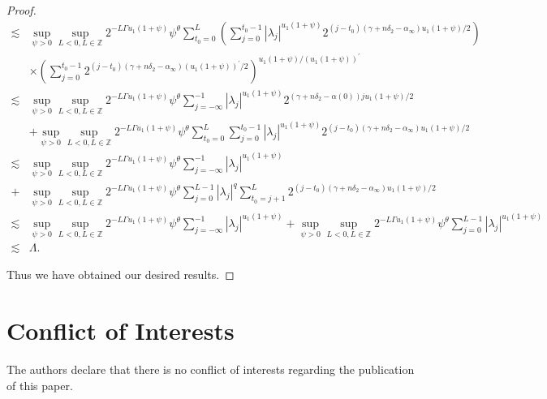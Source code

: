 \documentclass[oneside,reqno]{amsart}
\numberwithin{equation}{section}
\theoremstyle{definition}
\begin{document}
\begin{proof}
\begin{align*}
\lesssim & \sup_{\psi>0}\sup _{L <  0, L \in \mathbb{Z}} 2^{-L \Gamma u_1(1+\psi)} \psi^\theta \sum_{t_0=0}^{L}\left(\sum_{j=0}^{t_0-1}\left|\lambda_{j}\right|^{u_1(1+\psi)} 2^{(j-t_0)\left(\gamma+n\delta_2-\alpha_{\infty}\right) u_1(1+\psi) / 2}\right) \\
& \times\left(\sum_{j=0}^{t_0-1} 2^{(j-t_0)\left(\gamma+n\delta_2-\alpha_{\infty}\right) (u_1(1+\psi))^{\prime} / 2}\right)^{u_1(1+\psi) / (u_1(1+\psi))^{\prime}}\\
\lesssim & \sup_{\psi>0}\sup _{L <  0, L \in \mathbb{Z}} 2^{-L \Gamma u_1(1+\psi)} \psi^\theta \sum_{j=-\infty}^{-1}\left|\lambda_{j}\right|^{u_1(1+\psi)} 2^{\left(\gamma+n\delta_2-\alpha(0)\right) j u_1(1+\psi) / 2} \\
& +\sup_{\psi>0}\sup _{L <  0, L \in \mathbb{Z}} 2^{-L \Gamma u_1(1+\psi)} \psi^\theta \sum_{t_0=0}^{L} \sum_{j=0}^{t_0-1}\left|\lambda_{j}\right|^{u_1(1+\psi)} 2^{(j-t_0)\left(\gamma+n\delta_2-\alpha_{\infty}\right) u_1(1+\psi) / 2} \\
\lesssim & \sup_{\psi>0}\sup _{L <  0, L \in \mathbb{Z}} 2^{-L \Gamma u_1(1+\psi)} \psi^\theta \sum_{j=-\infty}^{-1}\left|\lambda_{j}\right|^{u_1(1+\psi)} \\
+& \sup_{\psi>0}\sup _{L <  0, L \in \mathbb{Z}} 2^{-L \Gamma u_1(1+\psi)} \psi^\theta \sum_{j=0}^{L-1}\left|\lambda_{j}\right|^{q} \sum_{t_0=j+1}^{L} 2^{(j-t_0)\left(\gamma+n\delta_2-\alpha_{\infty}\right) u_1(1+\psi) / 2} \\
\lesssim & \sup_{\psi>0}\sup _{L <  0, L \in \mathbb{Z}} 2^{-L \Gamma u_1(1+\psi)} \psi^\theta \sum_{j=-\infty}^{-1}\left|\lambda_{j}\right|^{u_1(1+\psi)}+\sup_{\psi>0}\sup _{L <  0, L \in \mathbb{Z}} 2^{-L \Gamma u_1(1+\psi)} \psi^\theta \sum_{j=0}^{L-1}\left|\lambda_{j}\right|^{u_1(1+\psi)}\\
\lesssim & \Lambda .
\end{align*}





Thus we have obtained our desired results. 

\end{proof}






\section*{Conflict of Interests}
The authors declare that there is no conflict of interests regarding the publication of this paper.
\end{document}
